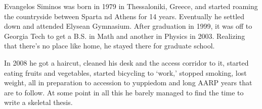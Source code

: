\renewcommand{\inputfile}{\version\ - edited 2008-06-26 vita}

Evangelos Siminos was born in 1979 in Thessaloniki, Greece, and
started roaming the countryside between Sparta nd Athens for 14 years.
Eventually he settled down and attended Elysean Gymnasium.
After graduation in 1999, it was off to Georgia Tech to get a B.S. in Math
and another in Physics in 2003.
Realizing that there's no place like home, he stayed there for graduate school.

In 2008 he got a haircut,
cleaned his desk and the access corridor to it, started eating fruits and vegetables,
started bicycling to `work,' stopped smoking, lost weight,
all in preparation to accession to yuppiedom and long AARP years that are to follow.
At some point in all this he barely managed to find the time to write a
skeletal thesis.
